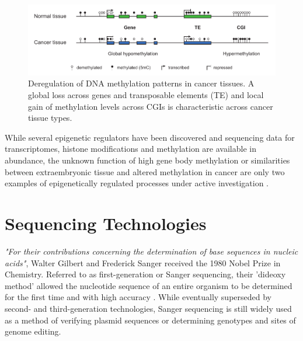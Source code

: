 \begin{figure}[h]
	\centering
	\includegraphics[width=1.0\textwidth]{figures/intro/cancer.pdf}
	\captionsetup{format=plain}
	\caption[DNA methylation in cancer]{Deregulation of DNA methylation patterns in cancer tissues. A global loss across genes and transposable elements (TE) and local gain of methylation levels across CGIs is characteristic across cancer tissue types.}
	\label{fig:intro:cancer}
\end{figure}

While several epigenetic regulators have been discovered and sequencing data for transcriptomes, histone modifications and methylation are available in abundance, the unknown function of high gene body methylation or similarities between extraembryonic tissue and altered methylation in cancer are only two examples of epigenetically regulated processes under active investigation \cite{McGuire2020}.




\section{Sequencing Technologies}
\label{sec:intro:sequencing}

\textit{"For their contributions concerning the determination of base sequences in nucleic acids"}, Walter Gilbert and Frederick Sanger received the 1980 Nobel Prize in Chemistry.
Referred to as first-generation or Sanger sequencing, their 'dideoxy method' allowed the nucleotide sequence of an entire organism to be determined for the first time and with high accuracy \cite{Sanger1977}.
While eventually superseded by second- and third-generation technologies, Sanger sequencing is still widely used as a method of verifying plasmid sequences or determining genotypes and sites of genome editing.

